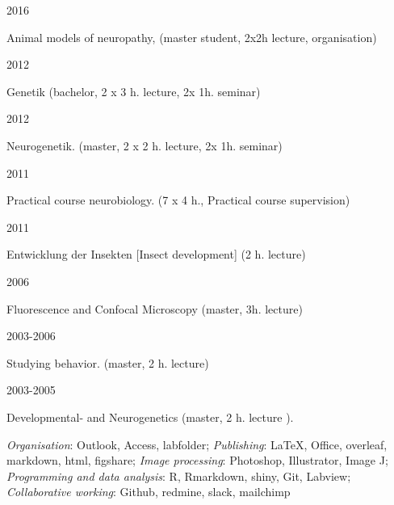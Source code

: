 \parbox{0.15\textwidth}{2016}\hfill
\parbox[t]{0.83\textwidth}{Animal models of neuropathy, (master student, 2x2h lecture, organisation)}
%
\parbox{0.15\textwidth}{2012}\hfill
\parbox[t]{0.83\textwidth}{Genetik (bachelor, 2 x 3 h. lecture, 2x 1h. seminar)}
\parbox{0.15\textwidth}{2012}\hfill
\parbox[t]{0.83\textwidth}{Neurogenetik. (master, 2 x 2 h. lecture, 2x 1h. seminar)}
\parbox{0.15\textwidth}{2011}\hfill
\parbox[t]{0.83\textwidth}{Practical course neurobiology. (7 x 4 h., Practical course supervision)}
\parbox{0.15\textwidth}{2011}\hfill
\parbox[t]{0.83\textwidth}{Entwicklung der Insekten [Insect development] (2 h. lecture)}
\parbox{0.15\textwidth}{2006}\hfill
\parbox[t]{0.83\textwidth}{Fluorescence and Confocal Microscopy (master, 3h. lecture)}
\parbox{0.15\textwidth}{2003-2006}\hfill
\parbox[t]{0.83\textwidth}{Studying behavior. (master, 2 h. lecture)}
\parbox{0.15\textwidth}{2003-2005}\hfill
\parbox[t]{0.83\textwidth}{Developmental- and Neurogenetics %
(master, 2 h. lecture%
).}


%
%
%
%
%
%
%
%
%
%
%
%
%
\emph{Organisation}: Outlook, Access, labfolder;
\emph{Publishing}: \LaTeX, Office, overleaf, markdown, html, figshare;
\emph{Image processing}: Photoshop, Illustrator, Image J; 
\emph{Programming and data analysis}:  R, Rmarkdown, shiny, Git, Labview;
\emph{Collaborative working}:  Github, redmine, slack, mailchimp

